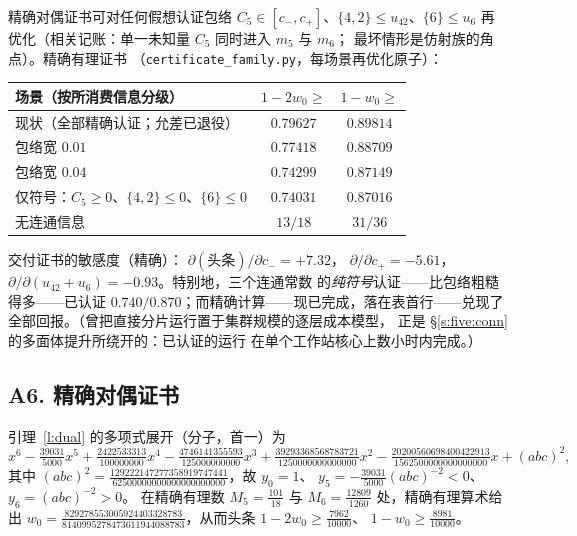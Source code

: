 \documentclass[11pt]{article}
\numberwithin{equation}{section}
\theoremstyle{definition}
\theoremstyle{remark}
\begin{document}
精确对偶证书可对任何假想认证包络
$C_5\in[c_-,c_+]$、$\{4,2\}\le u_{42}$、$\{6\}\le u_{6}$ 再
优化（相关记账：单一未知量 $C_5$ 同时进入 $m_5$ 与 $m_6$；
最坏情形是仿射族的角点）。精确有理证书
（\texttt{certificate\_family.py}，每场景再优化原子）：

\begin{center}
\begin{tabular}{lcc}
场景（按所消费信息分级） &
$1-2w_0\ge$ & $1-w_0\ge$\\
\hline
现状（全部精确认证；允差已退役） &
$0.79627$ & $0.89814$\\
包络宽 $0.01$ & $0.77418$ & $0.88709$\\
包络宽 $0.04$ & $0.74299$ & $0.87149$\\
仅符号：$C_5\ge0$、$\{4,2\}\le0$、$\{6\}\le0$ &
$0.74031$ & $0.87016$\\
无连通信息 & $13/18$ & $31/36$\\
\end{tabular}
\end{center}

\noindent 交付证书的敏感度（精确）：
$\partial(\text{头条})/\partial c_-=+7.32$，
$\partial/\partial c_+=-5.61$，
$\partial/\partial(u_{42}{+}u_6)=-0.93$。特别地，三个连通常数
的\emph{纯符号}认证——比包络粗糙得多——已认证
$0.740/0.870$；而精确计算——现已完成，落在表首行——兑现了
全部回报。（曾把直接分片运行置于集群规模的逐层成本模型，
正是 \S\ref{s:five:conn} 的多面体提升所绕开的：已认证的运行
在单个工作站核心上数小时内完成。）

\subsection*{A6. 精确对偶证书}

引理~\ref{l:dual} 的多项式展开（分子，首一）为
\[
x^6-\tfrac{39031}{5000}x^5+\tfrac{2422533313}{100000000}x^4
-\tfrac{4746141355593}{125000000000}x^3
+\tfrac{39293368568783721}{1250000000000000}x^2
-\tfrac{20200560698400422913}{1562500000000000000}x
+(abc)^2,
\]
其中 $(abc)^2=\tfrac{129222147277358919747441}
{62500000000000000000000}$，故 $y_0=1$、
$y_5=-\tfrac{39031}{5000}(abc)^{-2}<0$、$y_6=(abc)^{-2}>0$。
在精确有理数 $M_5=\tfrac{101}{18}$ 与
$M_6=\tfrac{12809}{1260}$ 处，精确有理算术给出
$w_0=\tfrac{829278553005924403328783}
{8140995278473611944088783}$，从而头条
$1-2w_0\ge\tfrac{7962}{10000}$、
$1-w_0\ge\tfrac{8981}{10000}$。
\end{document}
